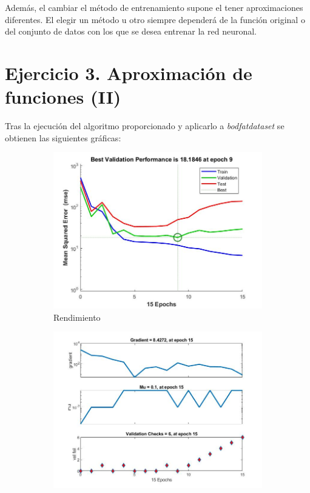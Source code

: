 \documentclass{article}
\begin{document}
Además, el cambiar el método de entrenamiento supone el tener aproximaciones
diferentes. El elegir un método u otro siempre dependerá de la función original
o del conjunto de datos con los que se desea entrenar la red neuronal.

\section{Ejercicio 3. Aproximación de funciones (II)}

Tras la ejecución del algoritmo proporcionado y aplicarlo a
\textit{bodfat\textunderscore dataset} se obtienen las siguientes gráficas: 

\begin{figure}[H]
 \centering
 \begin{subfigure}{0.4\textwidth}
  \includegraphics[width=0.8\linewidth]{../images/I_ex3_performance_bodyfat_dataset.jpg}
  \caption{Rendimiento}
 \end{subfigure}
 \begin{subfigure}{0.4\textwidth}
  \includegraphics[width=0.8\linewidth]{../images/I_ex3_trainingstate_bodyfat_dataset.jpg}

\end{subfigure}
\end{figure}
\end{document}
